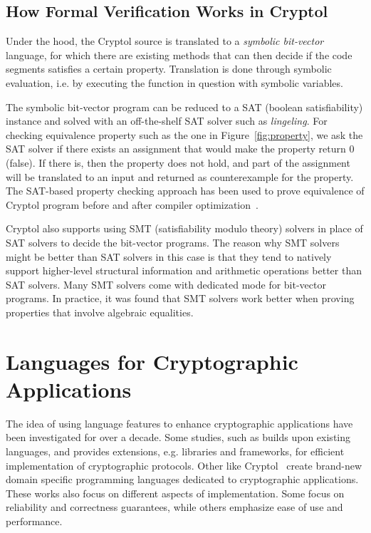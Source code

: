 \documentclass[a4paper, notitlepage]{report}
\begin{document}
\subsection{How Formal Verification Works in Cryptol}

Under the hood, the Cryptol source is translated to a \emph{symbolic bit-vector} language,
for which there are existing methods that can then decide if the code segments satisfies
a certain property. Translation is done through symbolic evaluation, i.e.
by executing the function in question with symbolic variables.

The symbolic bit-vector program can be reduced to a SAT (boolean satisfiability)
instance and solved with an
off-the-shelf SAT solver such as \emph{lingeling}. For checking equivalence property
such as the one in Figure~\ref{fig:property}, we ask the SAT solver if there exists
an assignment that would make the property return 0 (false). If there is, then the
property does not hold, and part of the assignment will be translated to an input
and returned as counterexample for the property. The SAT-based property checking
approach has been used to prove equivalence of Cryptol program before and after
compiler optimization~\cite{erkok2009pragmatic}.

Cryptol also supports using SMT (satisfiability modulo theory)
solvers in place of SAT solvers to decide the
bit-vector programs. The reason why SMT solvers might be better than SAT solvers
in this case is that they tend to natively support higher-level structural information
and arithmetic operations better than SAT solvers. Many SMT solvers come with dedicated
mode for bit-vector programs. In practice, it was found that SMT solvers work better
when proving properties that involve algebraic equalities.



\section{Languages for Cryptographic Applications}
\label{sec:crypto_lang}

The idea of using language features to enhance cryptographic applications 
have been investigated for over a decade. Some studies, such 
as \cite{akinyele2013charm} builds upon existing languages, and provides
extensions, e.g. libraries and frameworks, for efficient implementation 
of cryptographic protocols. 
Other like Cryptol~\cite{lewis2003cryptol} create brand-new domain specific 
programming languages dedicated to cryptographic applications. These
works also focus on different aspects of implementation. Some focus
on reliability and correctness guarantees, while others emphasize ease 
of use and performance.
\end{document}
